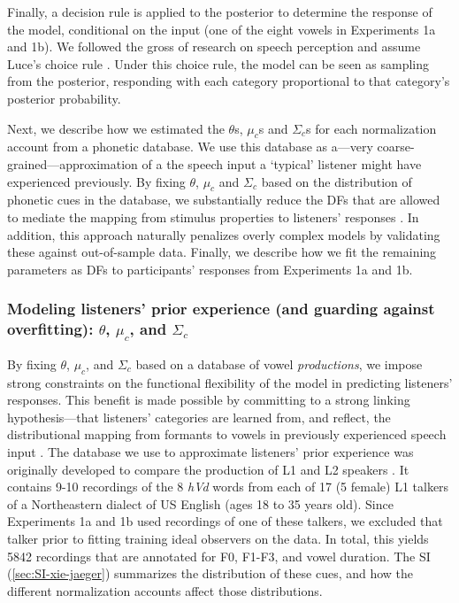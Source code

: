 \documentclass[preprint]{JASA}
\begin{document}
Finally, a decision rule is applied to the posterior to determine the response of the model, conditional on the input (one of the eight vowels in Experiments 1a and 1b). We followed the gross of research on speech perception and assume Luce's choice rule \citetext{\citealp{luce1959}; \citealp[for discussion, see][]{massaro-friedman1990}}. Under this choice rule, the model can be seen as sampling from the posterior, responding with each category proportional to that category's posterior probability.

Next, we describe how we estimated the \(\theta\)s, \(\mu_c\)s and \(\Sigma_c\)s for each normalization account from a phonetic database. We use this database as a---very coarse-grained---approximation of a the speech input a `typical' listener might have experienced previously. By fixing \(\theta\), \(\mu_c\) and \(\Sigma_c\) based on the distribution of phonetic cues in the database, we substantially reduce the DFs that are allowed to mediate the mapping from stimulus properties to listeners' responses \citep[following][]{xie2023}. In addition, this approach naturally penalizes overly complex models by validating these against out-of-sample data. Finally, we describe how we fit the remaining parameters as DFs to participants' responses from Experiments 1a and 1b.

\subsubsection{\texorpdfstring{Modeling listeners' prior experience (and guarding against overfitting): \(\theta\), \(\mu_c\), and \(\Sigma_c\)}{Modeling listeners' prior experience (and guarding against overfitting): \textbackslash theta, \textbackslash mu\_c, and \textbackslash Sigma\_c}}\label{modeling-listeners-prior-experience-and-guarding-against-overfitting-theta-mu_c-and-sigma_c}

By fixing \(\theta\), \(\mu_c\), and \(\Sigma_c\) based on a database of vowel \emph{productions}, we impose strong constraints on the functional flexibility of the model in predicting listeners' responses. This benefit is made possible by committing to a strong linking hypothesis---that listeners' categories are learned from, and reflect, the distributional mapping from formants to vowels in previously experienced speech input \citep[e.g.,][]{abramson-lisker1973, massaro-friedman1990, nearey-hogan1986}. The database we use to approximate listeners' prior experience was originally developed to compare the production of L1 and L2 speakers \citep{xie-jaeger2020}. It contains 9-10 recordings of the 8 \emph{hVd} words from each of 17 (5 female) L1 talkers of a Northeastern dialect of US English (ages 18 to 35 years old). Since Experiments 1a and 1b used recordings of one of these talkers, we excluded that talker prior to fitting training ideal observers on the data. In total, this yields 5842 recordings that are annotated for F0, F1-F3, and vowel duration. The SI (\ref{sec:SI-xie-jaeger}) summarizes the distribution of these cues, and how the different normalization accounts affect those distributions.
\end{document}
